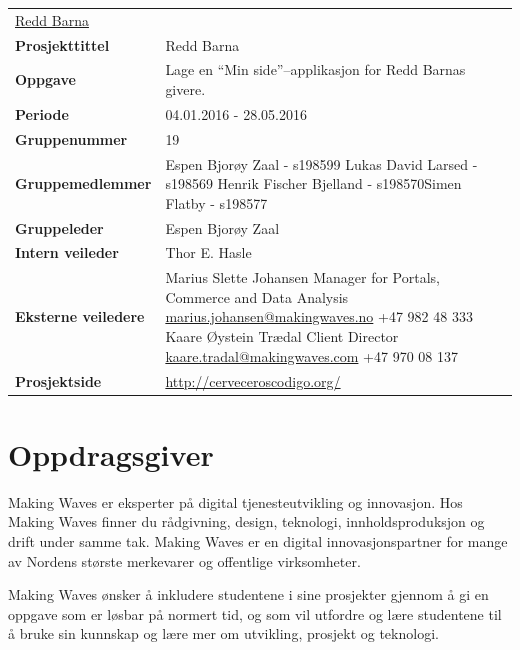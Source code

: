 \begin{flushleft}
\begin{tabular}[ht]{@{}lp{100mm}@{}}
\href{http://www.reddbarna.no/}{Redd Barna} \\
\textbf{Prosjekttittel} & Redd Barna \\ 
\textbf{Oppgave} & Lage en ``Min side''--applikasjon for Redd Barnas givere. \\ 
\textbf{Periode} & 04.01.2016 - 28.05.2016 \\ 
\textbf{Gruppenummer} & 19 \\ 
\textbf{Gruppemedlemmer} & Espen Bjorøy Zaal - s198599 \newline Lukas David Larsed - s198569 \newline Henrik Fischer Bjelland - s198570\newline Simen Flatby - s198577 \\ 
\textbf{Gruppeleder} & Espen Bjorøy Zaal \\ 
\textbf{Intern veileder} & Thor E. Hasle \\ 
\textbf{Eksterne veiledere} & Marius Slette Johansen \newline Manager for Portals, Commerce and Data Analysis \newline \href{mailto:marius.johansen@makingwaves.no}{marius.johansen@makingwaves.no} \newline +47 982 48 333 \newline \newline Kaare Øystein Trædal \newline Client Director \newline \href{mailto:kaare.tradal@makingwaves.com}{kaare.tradal@makingwaves.com} \newline +47 970 08 137 \\
\textbf{Prosjektside} & \url{http://cerveceroscodigo.org/} \\
\end{tabular} 
\end{flushleft}

\section{Oppdragsgiver}
Making Waves er eksperter på digital tjenesteutvikling og innovasjon. Hos Making Waves finner du rådgivning, design, teknologi, innholdsproduksjon og drift under samme tak. Making Waves er en digital innovasjonspartner for mange av Nordens største merkevarer og offentlige virksomheter.

Making Waves ønsker å inkludere studentene i sine prosjekter gjennom å gi en oppgave som er løsbar på normert tid, og som vil utfordre og lære studentene til å bruke sin kunnskap og lære mer om utvikling, prosjekt og teknologi.

